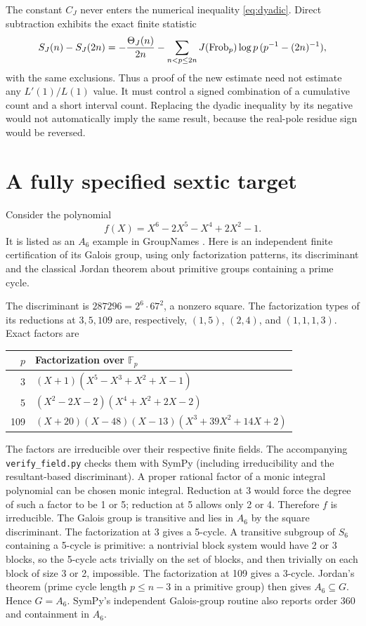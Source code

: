 \documentclass[11pt,letterpaper]{article}
\theoremstyle{remark}\newtheorem{remark}[theorem]{Remark}
\newcommand{\code}[1]{\nolinkurl{#1}}
\begin{document}
The constant $C_J$ never enters the numerical inequality \eqref{eq:dyadic}. Direct subtraction exhibits the exact finite statistic
\[
 S_J(n)-S_J(2n)=-\frac{\Theta_J(n)}{2n}
 -\sum_{n<p\le2n}J(\operatorname{Frob}_p)\log p\,(p^{-1}-(2n)^{-1}),
\]
with the same exclusions. Thus a proof of the new estimate need not estimate any $L'(1)/L(1)$ value. It must control a signed combination of a cumulative count and a short interval count. Replacing the dyadic inequality by its negative would not automatically imply the same result, because the real-pole residue sign would be reversed.

\section{A fully specified sextic target}\label{sec:example}
Consider the polynomial
\begin{equation}\label{eq:f}
 f(X)=X^6-2X^5-X^4+2X^2-1.
\end{equation}
It is listed as an $A_6$ example in GroupNames \cite{groupnames}. Here is an independent finite certification of its Galois group, using only factorization patterns, its discriminant and the classical Jordan theorem about primitive groups containing a prime cycle.

The discriminant is $287296=2^6\cdot67^2$, a nonzero square. The factorization types of its reductions at $3,5,109$ are, respectively, $(1,5)$, $(2,4)$, and $(1,1,1,3)$. Exact factors are
\begin{center}
\begin{tabularx}{\linewidth}{@{}rX@{}}
\toprule
$p$& Factorization over $\mathbb F_p$\\\midrule
3& $(X+1)(X^5-X^3+X^2+X-1)$\\
5& $(X^2-2X-2)(X^4+X^2+2X-2)$\\
109& $(X+20)(X-48)(X-13)(X^3+39X^2+14X+2)$\\\bottomrule
\end{tabularx}
\end{center}
The factors are irreducible over their respective finite fields. The accompanying \code{verify_field.py} checks them with SymPy (including irreducibility and the resultant-based discriminant). A proper rational factor of a monic integral polynomial can be chosen monic integral. Reduction at 3 would force the degree of such a factor to be 1 or 5; reduction at 5 allows only 2 or 4. Therefore $f$ is irreducible. The Galois group is transitive and lies in $A_6$ by the square discriminant. The factorization at 3 gives a 5-cycle. A transitive subgroup of $S_6$ containing a 5-cycle is primitive: a nontrivial block system would have 2 or 3 blocks, so the 5-cycle acts trivially on the set of blocks, and then trivially on each block of size 3 or 2, impossible. The factorization at 109 gives a 3-cycle. Jordan's theorem (prime cycle length $p\le n-3$ in a primitive group) then gives $A_6\subseteq G$. Hence $G=A_6$. SymPy's independent Galois-group routine also reports order 360 and containment in $A_6$.
\end{document}
